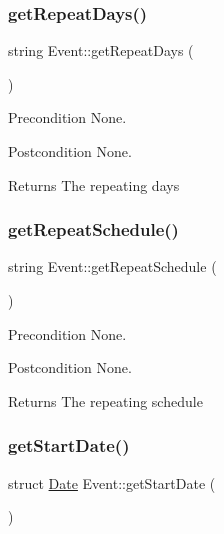 \subsubsection{\texorpdfstring{get\+Repeat\+Days()}{getRepeatDays()}}
{\footnotesize\ttfamily string Event\+::get\+Repeat\+Days (\begin{DoxyParamCaption}{ }\end{DoxyParamCaption})}

\begin{DoxyPrecond}{Precondition}
None. 
\end{DoxyPrecond}
\begin{DoxyPostcond}{Postcondition}
None. 
\end{DoxyPostcond}
\begin{DoxyReturn}{Returns}
The repeating days 
\end{DoxyReturn}
\hypertarget{class_event_a928d1271df4ff097dc7f8ffbe49e9410}{}\label{class_event_a928d1271df4ff097dc7f8ffbe49e9410} 
\subsubsection{\texorpdfstring{get\+Repeat\+Schedule()}{getRepeatSchedule()}}
{\footnotesize\ttfamily string Event\+::get\+Repeat\+Schedule (\begin{DoxyParamCaption}{ }\end{DoxyParamCaption})}

\begin{DoxyPrecond}{Precondition}
None. 
\end{DoxyPrecond}
\begin{DoxyPostcond}{Postcondition}
None. 
\end{DoxyPostcond}
\begin{DoxyReturn}{Returns}
The repeating schedule 
\end{DoxyReturn}
\hypertarget{class_event_a6536d75ba5b4dd9f86674f0fd81c75e1}{}\label{class_event_a6536d75ba5b4dd9f86674f0fd81c75e1} 
\subsubsection{\texorpdfstring{get\+Start\+Date()}{getStartDate()}}
{\footnotesize\ttfamily struct \hyperlink{struct_date}{Date} Event\+::get\+Start\+Date (\begin{DoxyParamCaption}{ }\end{DoxyParamCaption})}

